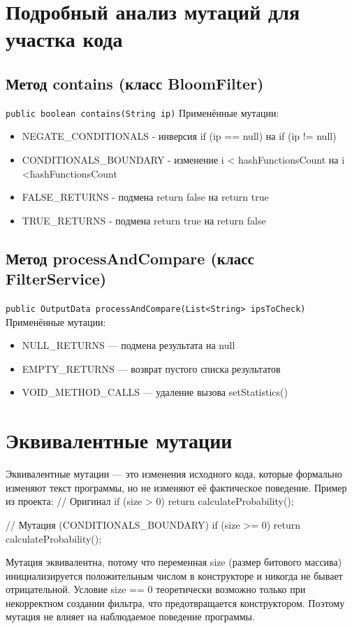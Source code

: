 \section{Подробный анализ мутаций для участка кода} \label{ch3:sec3}
\subsection{Метод contains (класс BloomFilter)}
\texttt{public boolean contains(String ip)}
Применённые мутации:
\begin{itemize}
	\item NEGATE\_CONDITIONALS - инверсия if (ip == null) на if (ip != null)
	\item CONDITIONALS\_BOUNDARY - изменение i < hashFunctionsCount на i <\= hashFunctionsCount
	\item FALSE\_RETURNS - подмена return false на return true
	\item TRUE\_RETURNS - подмена return true на return false
\end{itemize}

\subsection{Метод processAndCompare (класс FilterService)}
\texttt{public OutputData processAndCompare(List<String> ipsToCheck)}
Применённые мутации:
\begin{itemize}
	\item NULL\_RETURNS — подмена результата на null
	\item EMPTY\_RETURNS — возврат пустого списка результатов
	\item VOID\_METHOD\_CALLS — удаление вызова setStatistics()
\end{itemize}

\section{Эквивалентные мутации} \label{ch3:sec4}
Эквивалентные мутации — это изменения исходного кода, которые формально изменяют текст программы, но не изменяют её фактическое поведение.
Пример из проекта:
// Оригинал
if (size > 0) {
    return calculateProbability();
}

// Мутация (CONDITIONALS\_BOUNDARY)
if (size >= 0) {
    return calculateProbability();
}

Мутация эквивалентна, потому что переменная size (размер битового массива) инициализируется положительным числом в конструкторе и никогда не бывает отрицательной. Условие size == 0 теоретически возможно только при некорректном создании фильтра, что предотвращается конструктором. Поэтому мутация не влияет на наблюдаемое поведение программы.

